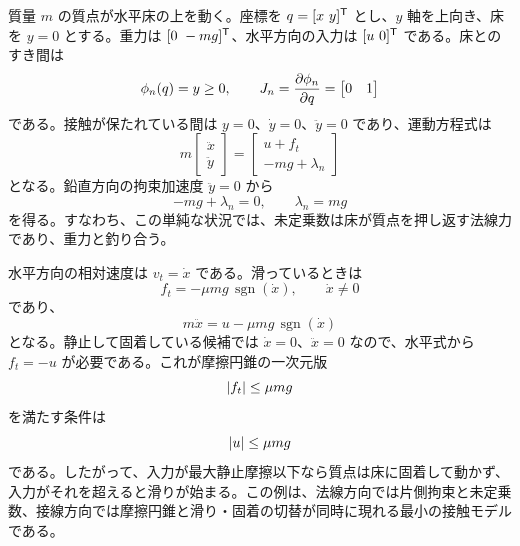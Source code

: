\begin{example}[水平床上の質点に働く法線力と摩擦]
質量 $m$ の質点が水平床の上を動く。座標を $q=[x\ y]^\T$ とし、$y$ 軸を上向き、床を $y=0$ とする。重力は $[0\ -mg]^\T$、水平方向の入力は $[u\ 0]^\T$ である。床とのすき間は
\begin{equation}
  \phi_n(q)=y\ge0,
  \qquad
  J_n=\frac{\partial \phi_n}{\partial q}
  =
  \begin{bmatrix}0&1\end{bmatrix}
\end{equation}
である。接触が保たれている間は $y=0$、$\dot{y}=0$、$\ddot{y}=0$ であり、運動方程式は
\begin{equation}
  m
  \begin{bmatrix}
    \ddot{x}\\
    \ddot{y}
  \end{bmatrix}
  =
  \begin{bmatrix}
    u+f_t\\
    -mg+\lambda_n
  \end{bmatrix}
\end{equation}
となる。鉛直方向の拘束加速度 $\ddot{y}=0$ から
\begin{equation}
  -mg+\lambda_n=0,
  \qquad
  \lambda_n=mg
\end{equation}
を得る。すなわち、この単純な状況では、未定乗数は床が質点を押し返す法線力であり、重力と釣り合う。

水平方向の相対速度は $v_t=\dot{x}$ である。滑っているときは
\begin{equation}
  f_t=-\mu mg\,\operatorname{sgn}(\dot{x}),
  \qquad
  \dot{x}\ne0
\end{equation}
であり、
\begin{equation}
  m\ddot{x}=u-\mu mg\,\operatorname{sgn}(\dot{x})
\end{equation}
となる。静止して固着している候補では $\dot{x}=0$、$\ddot{x}=0$ なので、水平式から $f_t=-u$ が必要である。これが摩擦円錐の一次元版
\begin{equation}
  \left|f_t\right|\le\mu mg
\end{equation}
を満たす条件は
\begin{equation}
  \left|u\right|\le\mu mg
\end{equation}
である。したがって、入力が最大静止摩擦以下なら質点は床に固着して動かず、入力がそれを超えると滑りが始まる。この例は、法線方向では片側拘束と未定乗数、接線方向では摩擦円錐と滑り・固着の切替が同時に現れる最小の接触モデルである。
\end{example}

